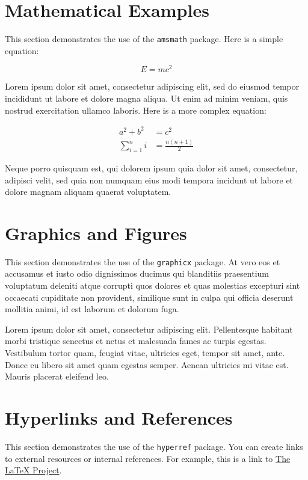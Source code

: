 \documentclass[12pt,a4paper]{article}
\begin{document}
\section{Mathematical Examples}

This section demonstrates the use of the \texttt{amsmath} package. Here is a simple equation:

\begin{equation}
    E = mc^2
\end{equation}

Lorem ipsum dolor sit amet, consectetur adipiscing elit, sed do eiusmod tempor incididunt ut labore et dolore magna aliqua. Ut enim ad minim veniam, quis nostrud exercitation ullamco laboris. Here is a more complex equation:

\begin{align}
    a^2 + b^2 &= c^2 \\
    \sum_{i=1}^{n} i &= \frac{n(n+1)}{2}
\end{align}

Neque porro quisquam est, qui dolorem ipsum quia dolor sit amet, consectetur, adipisci velit, sed quia non numquam eius modi tempora incidunt ut labore et dolore magnam aliquam quaerat voluptatem.

\section{Graphics and Figures}

This section demonstrates the use of the \texttt{graphicx} package. At vero eos et accusamus et iusto odio dignissimos ducimus qui blanditiis praesentium voluptatum deleniti atque corrupti quos dolores et quas molestias excepturi sint occaecati cupiditate non provident, similique sunt in culpa qui officia deserunt mollitia animi, id est laborum et dolorum fuga.

Lorem ipsum dolor sit amet, consectetur adipiscing elit. Pellentesque habitant morbi tristique senectus et netus et malesuada fames ac turpis egestas. Vestibulum tortor quam, feugiat vitae, ultricies eget, tempor sit amet, ante. Donec eu libero sit amet quam egestas semper. Aenean ultricies mi vitae est. Mauris placerat eleifend leo.

\section{Hyperlinks and References}

This section demonstrates the use of the \texttt{hyperref} package. You can create links to external resources or internal references. For example, this is a link to \href{https://www.latex-project.org/}{The LaTeX Project}.
\end{document}

